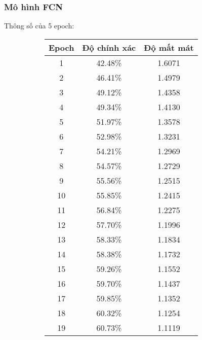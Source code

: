 \documentclass[../main.tex]{subfiles}
\begin{document}

\subsubsection*{Mô hình FCN}


Thông số của 5 epoch:

\begin{figure}[h!]
    \centering
    \begin{subfigure}[b]{0.45\textwidth}
        \centering
        \begin{tabular}{|c|c|c|}
            \hline
            \textbf{Epoch} & \textbf{Độ chính xác} & \textbf{Độ mất mát} \\
            \hline
            1 & 42.48\% & 1.6071 \\
            \hline
            2 & 46.41\% & 1.4979 \\
            \hline
            3 & 49.12\% & 1.4358 \\
            \hline
            4 & 49.34\% & 1.4130 \\
            \hline
            5 & 51.97\% & 1.3578 \\
            \hline
            6 & 52.98\% & 1.3231 \\
            \hline
            7 & 54.21\% & 1.2969 \\
            \hline
            8 & 54.57\% & 1.2729 \\
            \hline
            9 & 55.56\% & 1.2515 \\
            \hline
            10 & 55.85\% & 1.2415 \\
            \hline
            11 & 56.84\% & 1.2275 \\
            \hline
            12 & 57.70\% & 1.1996 \\
            \hline
            13 & 58.33\% & 1.1834 \\
            \hline
            14 & 58.38\% & 1.1732 \\
            \hline
            15 & 59.26\% & 1.1552 \\
            \hline
            16 & 59.70\% & 1.1437 \\
            \hline
            17 & 59.85\% & 1.1352 \\
            \hline
            18 & 60.32\% & 1.1254 \\
            \hline
            19 & 60.73\% & 1.1119 \\

\end{tabular}
\end{subfigure}
\end{figure}
\end{document}
